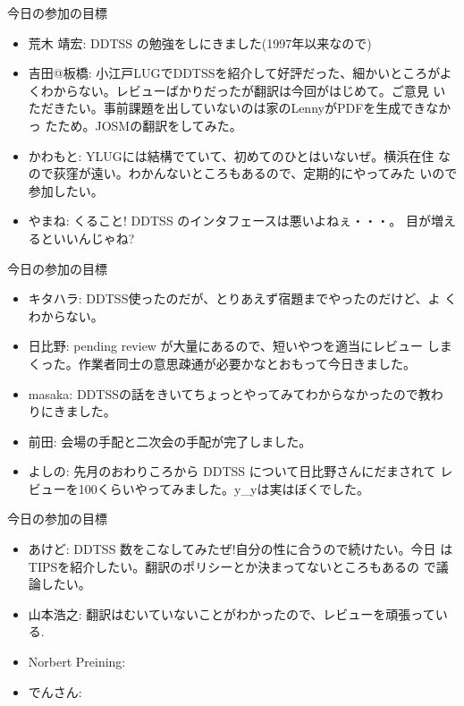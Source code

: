 \frame{\titlepage{}}


\begin{frame}{今日の参加の目標}
\begin{itemize}
 \item 荒木 靖宏: DDTSS の勉強をしにきました(1997年以来なので)
 \item 吉田@板橋: 小江戸LUGでDDTSSを紹介して好評だった、細かいところがよ
       くわからない。レビューばかりだったが翻訳は今回がはじめて。ご意見
       いただきたい。事前課題を出していないのは家のLennyがPDFを生成できなかっ
       たため。JOSMの翻訳をしてみた。
 \item かわもと: YLUGには結構でていて、初めてのひとはいないぜ。横浜在住
       なので荻窪が遠い。わかんないところもあるので、定期的にやってみた
       いので参加したい。
 \item やまね: くること! DDTSS のインタフェースは悪いよねぇ・・・。
       目が増えるといいんじゃね?
\end{itemize}
\end{frame}

\begin{frame}{今日の参加の目標}
\begin{itemize}
 \item キタハラ: DDTSS使ったのだが、とりあえず宿題までやったのだけど、よ
       くわからない。
 \item 日比野: pending review が大量にあるので、短いやつを適当にレビュー
       しまくった。作業者同士の意思疎通が必要かなとおもって今日きました。
 \item masaka: DDTSSの話をきいてちょっとやってみてわからなかったので教わ
       りにきました。
 \item 前田: 会場の手配と二次会の手配が完了しました。
 \item よしの: 先月のおわりころから DDTSS について日比野さんにだまされて
       レビューを100くらいやってみました。y\_yは実はぼくでした。
\end{itemize}
\end{frame}

\begin{frame}{今日の参加の目標}
\begin{itemize}
 \item あけど: DDTSS 数をこなしてみたぜ!自分の性に合うので続けたい。今日
       はTIPSを紹介したい。翻訳のポリシーとか決まってないところもあるの
       で議論したい。
 \item 山本浩之: 翻訳はむいていないことがわかったので、レビューを頑張ってい
       る.
 \item Norbert Preining:
 \item でんさん:
\end{itemize}
\end{frame}

